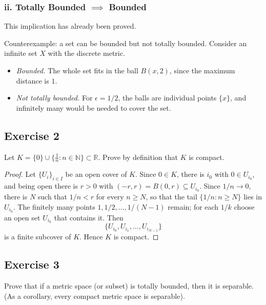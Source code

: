 \documentclass[11pt, a4paper]{article}
\begin{document}
\subsubsection*{ii. Totally Bounded $\implies$ Bounded}
This implication has already been proved.

Counterexample: a set can be bounded but not totally bounded. Consider an infinite
set $X$ with the discrete metric.
\begin{itemize}
    \item \textit{Bounded.} The whole set fits in the ball $B(x, 2)$, since the maximum distance is
    $1$.
    \item \textit{Not totally bounded.} For $\epsilon = 1/2$, the balls are individual points
    $\{x\}$, and infinitely many would be needed to cover the set.
\end{itemize}

\subsection*{Exercise 2}

Let $K = \{0\} \cup \{ \frac{1}{n} : n \in \mathbb{N} \} \subset \mathbb{R}$. Prove by definition
that $K$ is compact.

\begin{proof}
Let $\{U_i\}_{i \in I}$ be an open cover of $K$. Since $0 \in K$, there is $i_0$ with $0 \in U_{i_0}$,
and being open there is $r > 0$ with $(-r, r) = B(0, r) \subseteq U_{i_0}$. Since $1/n \to 0$, there is
$N$ such that $1/n < r$ for every $n \ge N$, so that the tail $\{1/n : n \ge N\}$ lies in $U_{i_0}$.
The finitely many points $1, 1/2, \dots, 1/(N-1)$ remain; for each $1/k$ choose an open set $U_{i_k}$ that
contains it. Then
$$ \{ U_{i_0}, U_{i_1}, \dots, U_{i_{N-1}} \} $$
is a finite subcover of $K$. Hence $K$ is compact.
\end{proof}

\subsection*{Exercise 3}

Prove that if a metric space (or subset) is totally bounded, then it is separable.
(As a corollary, every compact metric space is separable).
\end{document}
